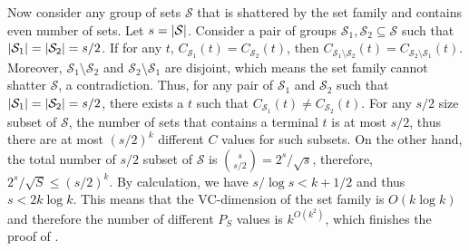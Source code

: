 Now consider any group of sets $\mathcal{S}$ that is shattered by the set family and contains even number of sets. Let $s=\left| \mathcal{S} \right|$. Consider a pair of groups $\mathcal{S}_1,\mathcal{S}_2 \subseteq \mathcal{S}$ such that $\left| \mathcal{S}_1 \right| = \left| \mathcal{S}_2 \right| = s/2$. If for any $t$, $C_{\mathcal{S}_1}(t) = C_{\mathcal{S}_2}(t)$, then $C_{\mathcal{S}_1 \setminus \mathcal{S}_2}(t) = C_{\mathcal{S}_2 \setminus \mathcal{S}_1}(t)$. Moreover, $\mathcal{S}_1 \setminus \mathcal{S}_2$ and $\mathcal{S}_2 \setminus \mathcal{S}_1$ are disjoint, which means the set family cannot shatter $\mathcal{S}$, a contradiction. Thus, for any pair of $\mathcal{S}_1$ and $\mathcal{S}_2$ such that $\left| \mathcal{S}_1 \right| = \left| \mathcal{S}_2 \right| = s/2$, there exists a $t$ such that $C_{\mathcal{S}_1}(t) \neq C_{\mathcal{S}_2}(t)$. For any $s/2$ size subset of $\mathcal{S}$, the number of sets that contains a terminal $t$ is at most $s/2$, thus there are at most $(s/2)^k$ different $C$ values for such subsets. On the other hand, the total number of $s/2$ subset of $\mathcal{S}$ is $\binom{s}{s/2} = 2^s/\sqrt{s}$, therefore, $2^s/\sqrt{S} \le (s/2)^k$. By calculation, we have $s/\log s < k + 1/2$ and thus $s < 2 k \log k$. This means that the VC-dimension of the set family is $O(k \log k)$ and therefore the number of different $P_S$ values is $k^{O(k^2)}$, which finishes the proof of .
\fi